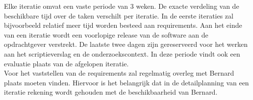 {\gray
Elke iteratie omvat een vaste periode van 3 weken.
De exacte verdeling van de beschikbare tijd over de taken verschilt per iteratie.
In de eerste iteraties zal bijvoorbeeld relatief meer tijd worden besteed aan requirements.
Aan het einde van een iteratie wordt een voorlopige release van de software aan de
opdrachtgever verstrekt. De laatste twee dagen zijn gereserveerd voor het werken
aan het scriptieverslag en de onderzoekscontext. In deze periode vindt
ook een evaluatie plaats van de afgelopen iteratie. \\
Voor het vaststellen van de requirements zal regelmatig overleg met Bernard plaats
moeten vinden. Hiervoor is het belangrijk dat in de detailplanning van een iteratie
rekening wordt gehouden met de beschikbaarheid van Bernard.
}%

